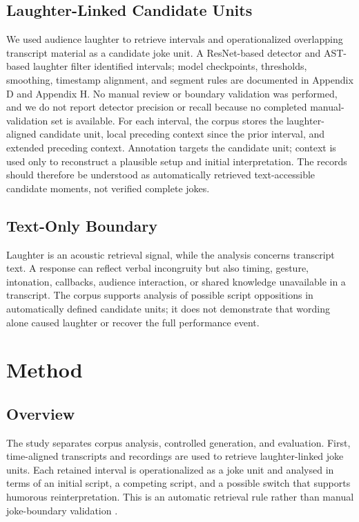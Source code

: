 \documentclass[11pt]{article}
\begin{document}
\subsection{Laughter-Linked Candidate Units}\label{laughter-linked-candidate-units}

We used audience laughter to retrieve intervals and operationalized overlapping transcript material as a candidate joke unit. A ResNet-based detector and AST-based laughter filter identified intervals; model checkpoints, thresholds, smoothing, timestamp alignment, and segment rules are documented in Appendix D and Appendix H. No manual review or boundary validation was performed, and we do not report detector precision or recall because no completed manual-validation set is available. For each interval, the corpus stores the laughter-aligned candidate unit, local preceding context since the prior interval, and extended preceding context. Annotation targets the candidate unit; context is used only to reconstruct a plausible setup and initial interpretation. The records should therefore be understood as automatically retrieved text-accessible candidate moments, not verified complete jokes.

\subsection{Text-Only Boundary}\label{text-only-boundary}

Laughter is an acoustic retrieval signal, while the analysis concerns transcript text. A response can reflect verbal incongruity but also timing, gesture, intonation, callbacks, audience interaction, or shared knowledge unavailable in a transcript. The corpus supports analysis of possible script oppositions in automatically defined candidate units; it does not demonstrate that wording alone caused laughter or recover the full performance event.

\section{Method}\label{method}

\subsection{Overview}\label{overview}

The study separates corpus analysis, controlled generation, and evaluation. First, time-aligned transcripts and recordings are used to retrieve laughter-linked joke units. Each retained interval is operationalized as a joke unit and analysed in terms of an initial script, a competing script, and a possible switch that supports humorous reinterpretation. This is an automatic retrieval rule rather than manual joke-boundary validation \citep{raskin1985,amin2020survey}.
\end{document}
